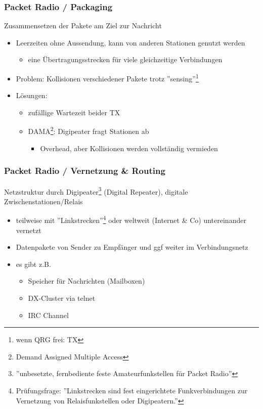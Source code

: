 \begin{frame}
    \frametitle{Packet Radio / Packaging}

    Zusammensetzen der Pakete am Ziel zur Nachricht \\[1em]

    \begin{itemize}
        \item Leerzeiten ohne Aussendung, kann von anderen Stationen genutzt werden
        \begin{itemize}      
            \item eine Übertragungsstrecken für viele gleichzeitige Verbindungen
        \end{itemize}
        \item Problem: Kollisionen verschiedener Pakete trotz
              ''sensing''\footnote{wenn QRG frei: TX}
        \item Lösungen:
        \begin{itemize}
            \item zufällige Wartezeit beider TX
            \item DAMA\footnote{Demand Assigned Multiple Access}: Digipeater fragt Stationen ab
            \begin{itemize}
                \item Overhead, aber Kollisionen werden vollständig vermieden
            \end{itemize}
        \end{itemize}
    \end{itemize}

\end{frame}

\begin{frame}
    \frametitle{Packet Radio / Vernetzung \& Routing}

    Netzstruktur durch Digipeater\footnote{''unbesetzte, fernbediente feste
    Amateurfunkstellen für Packet Radio''} (Digital Repeater), digitale
    Zwischenstationen/Relais

    \begin{itemize}
        \item teilweise mit ''Linkstrecken''\footnote{Prüfungsfrage:
              ''Linkstrecken sind fest eingerichtete Funkverbindungen zur
              Vernetzung von Relaisfunkstellen oder Digipeatern.''} oder
              weltweit (Internet \& Co) untereinander vernetzt
        \item Datenpakete von Sender zu Empfänger und ggf weiter im Verbindungsnetz
        \item es gibt z.B.
        \begin{itemize}
            \item Speicher für Nachrichten (Mailboxen)
            \item DX-Cluster via telnet
            \item IRC Channel
        \end{itemize}
    \end{itemize}

\end{frame}

